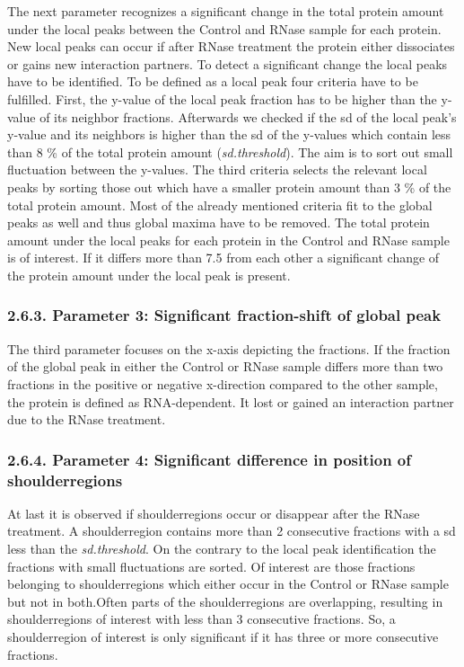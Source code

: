 \documentclass[
  12pt,
]{article}
\begin{document}
The next parameter recognizes a significant change in the total protein
amount under the local peaks between the Control and RNase sample for
each protein. New local peaks can occur if after RNase treatment the
protein either dissociates or gains new interaction partners. To detect
a significant change the local peaks have to be identified. To be
defined as a local peak four criteria have to be fulfilled. First, the
y-value of the local peak fraction has to be higher than the y-value of
its neighbor fractions. Afterwards we checked if the sd of the local
peak's y-value and its neighbors is higher than the sd of the y-values
which contain less than 8 \% of the total protein amount
(\emph{sd.threshold}). The aim is to sort out small fluctuation between
the y-values. The third criteria selects the relevant local peaks by
sorting those out which have a smaller protein amount than 3 \% of the
total protein amount. Most of the already mentioned criteria fit to the
global peaks as well and thus global maxima have to be removed. The
total protein amount under the local peaks for each protein in the
Control and RNase sample is of interest. If it differs more than 7.5
from each other a significant change of the protein amount under the
local peak is present.

\hypertarget{parameter-3-significant-fraction-shift-of-global-peak}{%
\subsubsection{2.6.3. Parameter 3: Significant fraction-shift of global
peak}\label{parameter-3-significant-fraction-shift-of-global-peak}}

The third parameter focuses on the x-axis depicting the fractions. If
the fraction of the global peak in either the Control or RNase sample
differs more than two fractions in the positive or negative x-direction
compared to the other sample, the protein is defined as RNA-dependent.
It lost or gained an interaction partner due to the RNase treatment.

\hypertarget{parameter-4-significant-difference-in-position-of-shoulderregions}{%
\subsubsection{2.6.4. Parameter 4: Significant difference in position of
shoulderregions}\label{parameter-4-significant-difference-in-position-of-shoulderregions}}

At last it is observed if shoulderregions occur or disappear after the
RNase treatment. A shoulderregion contains more than 2 consecutive
fractions with a sd less than the \emph{sd.threshold}. On the contrary
to the local peak identification the fractions with small fluctuations
are sorted. Of interest are those fractions belonging to shoulderregions
which either occur in the Control or RNase sample but not in both.Often
parts of the shoulderregions are overlapping, resulting in
shoulderregions of interest with less than 3 consecutive fractions. So,
a shoulderregion of interest is only significant if it has three or more
consecutive fractions.
\end{document}
